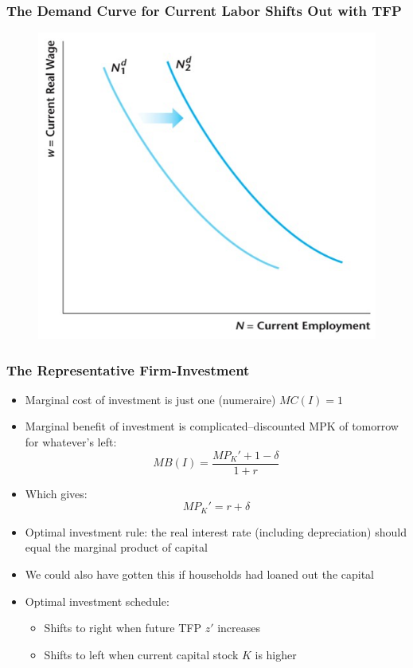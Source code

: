 \documentclass{beamer}
\begin{document}
\begin{frame}
\frametitle[alignment=center]{The Demand Curve for Current Labor Shifts Out with TFP}
\begin{figure}
\centering
\includegraphics[scale=0.6]{Figures/W_Fig_11pt8.png}
\end{figure}
\end{frame}

\begin{frame}
\frametitle[alignment=center]{The Representative Firm-Investment}
\begin{itemize}
\item Marginal cost of investment is just one (numeraire) $MC(I)=1$
\bigskip
\item Marginal benefit of investment is complicated--discounted MPK of tomorrow for whatever's left:
$$MB(I)=\frac{MP_K'+1-\delta}{1+r}$$
\item Which gives:
$$MP_K'=r+\delta$$
\item Optimal investment rule:  the real interest rate (including depreciation) should equal the marginal product of capital
\bigskip
\item We could also have gotten this if households had loaned out the capital
\bigskip
\item Optimal investment schedule:
\begin{itemize}
\item Shifts to right when future TFP $z'$ increases
\item Shifts to left when current capital stock $K$ is higher 
\end{itemize}
\end{itemize}
\end{frame}
\end{document}
